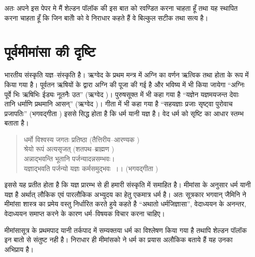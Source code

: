 अतः अपने इस पेपर मे मैं शेल्डन पॉलॉक की इस बात को रवण्डित करना चाहता हूँ तथा यह स्थापित करना चाहता हूँ कि जिन बातोें को वे निराधार कहते हैं वे बिल्कुल सटीक तथा सत्य है।


\section*{पूर्वमीमांसा की दृष्टि}

भारतीय संस्कृति यज्ञ–संस्कृति है। ऋग्वेद के प्रथम मन्त्र में अग्नि का वर्णन ऋत्विक तथा होता के रूप में किया गया है। पूर्वतन ऋषियों के द्वारा अग्नि की पूजा की गई है और भविष्य में भी किया जायेगा “अग्निः पूर्वे भिः ऋषिभिः ईड्यः नूतनैः उत” (ऋग्वेद )। पुरुषसूक्त में भी कहा गया है “यज्ञेन यज्ञमयजन्त देवाः तानि धर्माणि प्रथमानि आसन्” (ऋग्वेद )। गीता में भी कहा गया है “सहयज्ञाः प्रजाः सृष्ट्वा पुरोवाच प्रजापतिः” (भगवद्गीता ) इससे सिद्ध होता है कि धर्म यानी यज्ञ है। वेद धर्म को सृष्टि का आधार स्तम्भ बताता है।

\begin{verse}
धर्मो विश्वस्य जगतः प्रतिष्ठा (तैत्तिरीय–आरण्यक )\\ श्रेयो रूपं अत्यसृजत् (शतपथ–ब्राह्मण )\\ अन्नाद्भवन्ति भूतानि पर्जन्यादन्नसम्भवः।\\ यज्ञाद्भवति पर्जन्यो यज्ञः कर्मसमुद्भवः~।। (भगवद्गीता )
\end{verse}

इससे यह प्रतीत होता है कि यज्ञ प्रारम्भ से ही हमारी संस्कृति में समाहित है। मीमांसा के अनुसार धर्म यानी यज्ञ है अर्थात् लौकिक एवं पारलौकिक अभ्युदय का हेतु एकमात्र धर्म है। अतः सूत्रकार भगवान् जैमिनि ने मीमांसा शास्त्र का प्रमेय वस्तु निर्धारित करते हुये कहते है “अथातो धर्मजिज्ञासा”, वेदाध्ययन के अनन्तर, वेदाध्ययन समाप्त करने के कारण धर्म–विषयक विचार करना चाहिए।

मीमांसासूत्र के प्रथमपाद यानी तर्कपाद में सम्यक्तया धर्म का विश्लेषण किया गया है तथापि शेल्डन पॉलॉक इन बातो से संतुष्ट नही है। निराधार ही मीमांसको ने धर्म का प्रयास अलौकिक बताये हैं यह उनका अभिप्राय है।

\begin{myquote}
\end{myquote}

